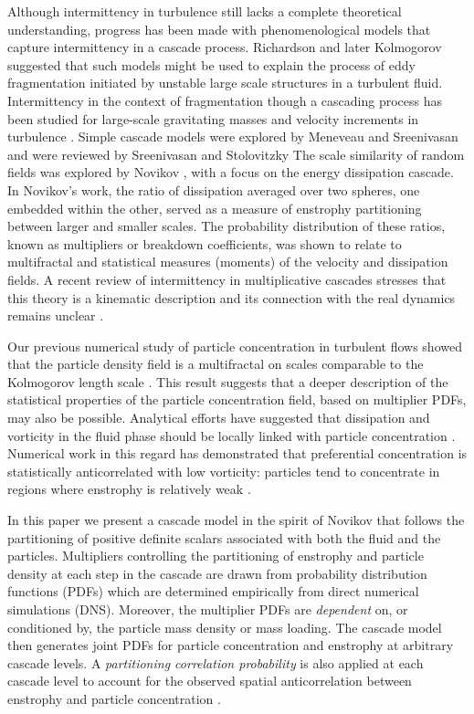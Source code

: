 \documentclass[aps,pra,twocolumn,groupedaddress,showkeys,showpacs,floatfix]{revtex4}
\begin{document}
Although intermittency in turbulence still lacks a complete theoretical
understanding, progress has been made with phenomenological models that capture
intermittency in a cascade process. Richardson \cite{Richardson:1} and 
later Kolmogorov \cite{Komolgorov:1}
suggested that such models might be used to explain the process of eddy
fragmentation initiated by unstable large scale structures in a turbulent fluid.
Intermittency in the context of fragmentation though a cascading process has
been studied for large-scale gravitating masses \cite{Chiueh:1} and velocity
increments in turbulence \cite{Gorokhovski:1}. Simple cascade models were
explored by Meneveau and Sreenivasan \cite{Meneveau:3} and were reviewed by 
Sreenivasan and Stolovitzky \cite{Sreenivasan:1}
The scale similarity of random fields was explored by Novikov \cite{Novikov:2,Novikov:1}, with a focus 
on the energy dissipation cascade. In Novikov's work, the ratio of 
dissipation averaged over two spheres, one embedded within
the other, served as a measure of enstrophy partitioning between larger and smaller
scales. The probability distribution of these ratios, known as multipliers or
breakdown coefficients, was shown to relate to multifractal and statistical
measures (moments) of the velocity and dissipation fields. A recent review of
intermittency in multiplicative cascades  stresses that this theory is a
kinematic description and its connection with the real dynamics remains unclear \cite{Jimenez:1}.

Our previous numerical study of particle concentration in turbulent flows showed
that the particle density field is a multifractal on scales comparable to the
Kolmogorov length scale \cite{Hogan:1}. This result suggests that a deeper
description of the statistical properties of the particle concentration field,
based on multiplier PDFs, may also be possible. Analytical efforts have
suggested that dissipation and vorticity in the fluid phase should be locally
linked with particle concentration \cite{Maxey:1}. Numerical work in this regard
has demonstrated that preferential concentration is statistically
anticorrelated with low vorticity: particles tend to concentrate in regions
where enstrophy is relatively weak \cite{Squires:3,Ahmed:2}.

In this paper we present a cascade model in the spirit of Novikov \cite{Novikov:2,Novikov:1}
that follows the partitioning of positive definite scalars associated with both
the fluid and the particles. Multipliers controlling the partitioning of
enstrophy and particle density at each step in the cascade are drawn from
probability distribution functions (PDFs) which are determined empirically from
direct numerical simulations (DNS). Moreover, the multiplier PDFs are {\it
dependent} on, or conditioned by, the particle mass density or mass loading.
The cascade model then generates joint PDFs for particle concentration and
enstrophy at arbitrary cascade levels. A {\it partitioning correlation
probability} is also applied at each cascade level to account for the observed
spatial anticorrelation between enstrophy and particle concentration \cite{Squires:3,Eaton:1}.
\end{document}
